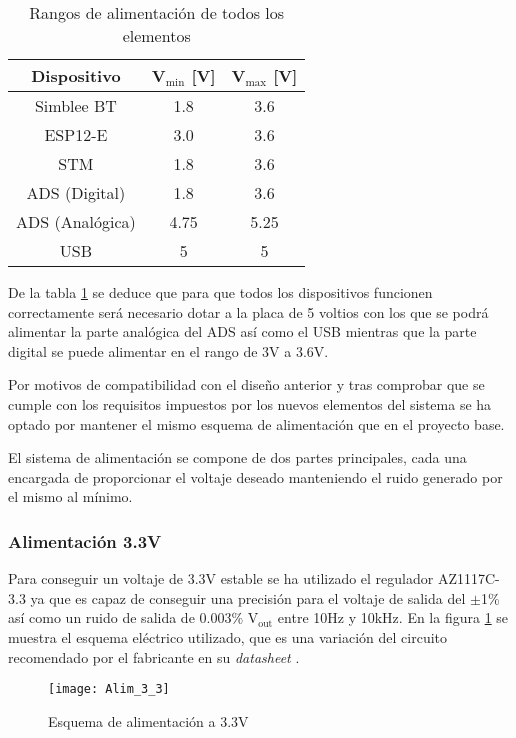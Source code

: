 \begin{table} [h]
	\centering
	\begin{tabular}{|c|c|c|}
	\hline 
	Dispositivo & V$_{\text{min}}$ [V] & V$_{\text{max}}$ [V] \\ 
	\hline 
	Simblee BT & 1.8 & 3.6 \\ 
	\hline 
	ESP12-E & 3.0 & 3.6 \\ 
	\hline 
	STM & 1.8 & 3.6 \\ 
	\hline 
	ADS (Digital) & 1.8 & 3.6 \\ 
	\hline 
	ADS (Analógica) & 4.75 & 5.25 \\ 
	\hline 
	USB & 5 & 5 \\ 
	\hline 
	\end{tabular} 
	\caption{Rangos de alimentación de todos los elementos}
	\label{tab:Alimentacion}
\end{table}

De la tabla \ref{tab:Alimentacion} se deduce que para que todos los dispositivos funcionen correctamente será necesario dotar a la placa de 5 voltios con los que se podrá alimentar la parte analógica del ADS así como el USB mientras que la parte digital se puede alimentar en el rango de 3V a 3.6V. 

Por motivos de compatibilidad con el diseño anterior y tras comprobar que se cumple con los requisitos impuestos por los nuevos elementos del sistema se ha optado por mantener el mismo esquema de alimentación que en el proyecto base.

El sistema de alimentación se compone de dos partes principales, cada una encargada de proporcionar el voltaje deseado manteniendo el ruido generado por el mismo al mínimo.

\subsubsection{Alimentación 3.3V\label{sec:Alimentacion_3.3V}}
Para conseguir un voltaje de 3.3V estable se ha utilizado el regulador AZ1117C-3.3 ya que es capaz de conseguir una precisión para el voltaje de salida del $\pm$1\% así como un ruido de salida de 0.003\% V$_{\text{out}}$ entre 10Hz y 10kHz.
En la figura \ref{fig:Alim_3.3} se muestra el esquema eléctrico utilizado, que es una variación del circuito recomendado por el fabricante en su \textit{datasheet} \cite{Datasheet_3.3}.

\begin{figure} [h]
    \centering
    \texttt{[image: Alim\_3\_3]}
    \caption{Esquema de alimentación a 3.3V}
    \label{fig:Alim_3.3}
\end{figure}


